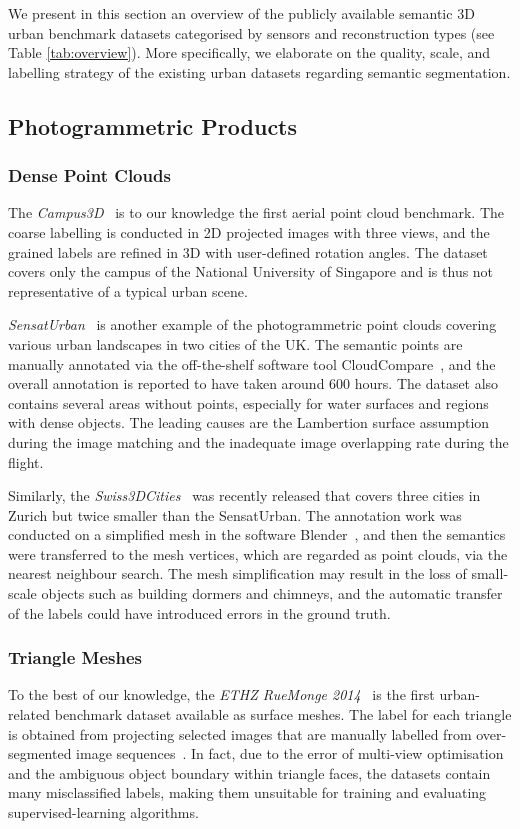 We present in this section an overview of the publicly available semantic 3D urban benchmark datasets categorised by sensors and reconstruction types (see Table \ref{tab:overview}).
More specifically, we elaborate on the quality, scale, and labelling strategy of the existing urban datasets regarding semantic segmentation.


\subsection{Photogrammetric Products}

\subsubsection{Dense Point Clouds} The \emph{Campus3D}~\citep{li2020campus3d} is to our knowledge the first aerial point cloud benchmark.
The coarse labelling is conducted in 2D projected images with three views, and the grained labels are refined in 3D with user-defined rotation angles. 
The dataset covers only the campus of the National University of Singapore and is thus not representative of a typical urban scene.

\emph{SensatUrban}~\citep{hu2021towards} is another example of the photogrammetric point clouds covering various urban landscapes in two cities of the UK\@.
The semantic points are manually annotated via the off-the-shelf software tool CloudCompare~\citep{Girardeau-Montaut2016}, and the overall annotation is reported to have taken around 600 hours.
The dataset also contains several areas without points, especially for water surfaces and regions with dense objects. 
The leading causes are the Lambertion surface assumption during the image matching and the inadequate image overlapping rate during the flight.   

Similarly, the \emph{Swiss3DCities}~\citep{can2020semantic} was recently released that covers three cities in Zurich but twice smaller than the SensatUrban.
The annotation work was conducted on a simplified mesh in the software Blender~\citep{blender}, and then the semantics were transferred to the mesh vertices, which are regarded as point clouds, via the nearest neighbour search.    
The mesh simplification may result in the loss of small-scale objects such as building dormers and chimneys, and the automatic transfer of the labels could have introduced errors in the ground truth. 

\subsubsection{Triangle Meshes} To the best of our knowledge, the \emph{ETHZ RueMonge 2014}~\citep{riemenschneider2014learning} is the first urban-related benchmark dataset available as surface meshes.
The label for each triangle is obtained from projecting selected images that are manually labelled from over-segmented image sequences~\citep{brostow2009semantic}. 
In fact, due to the error of multi-view optimisation and the ambiguous object boundary within triangle faces, the datasets contain many misclassified labels, making them unsuitable for training and evaluating supervised-learning algorithms.

